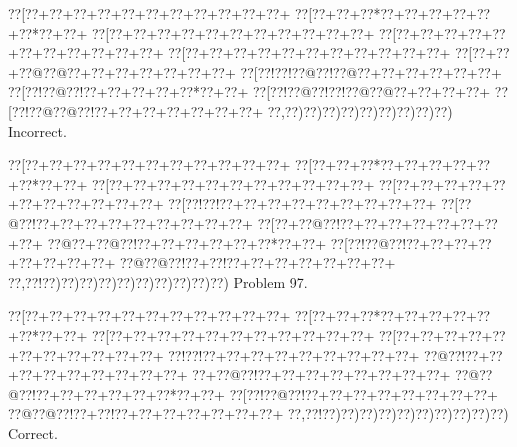 \documentclass[a5paper]{article}
\begin{document}
\begin{center}
{\goo
\0??[\0??+\0??+\0??+\0??+\0??+\0??+\0??+\0??+\0??+\0??+\0??+
\0??[\0??+\0??+\0??*\0??+\0??+\0??+\0??+\0??+\0??*\0??+\0??+
\0??[\0??+\0??+\0??+\0??+\0??+\0??+\0??+\0??+\0??+\0??+\0??+
\0??[\0??+\0??+\0??+\0??+\0??+\0??+\0??+\0??+\0??+\0??+\0??+
\0??[\0??+\0??+\0??+\0??+\0??+\0??+\0??+\0??+\0??+\0??+\0??+
\0??[\0??+\0??+\0??@\0??@\0??+\0??+\0??+\0??+\0??+\0??+\0??+
\0??[\0??!\0??!\0??@\0??!\0??@\0??+\0??+\0??+\0??+\0??+\0??+
\0??[\0??!\0??@\0??!\0??+\0??+\0??+\0??+\0??*\0??+\0??+
\0??[\0??!\0??@\0??!\0??!\0??@\0??@\0??+\0??+\0??+\0??+
\0??[\0??!\0??@\0??@\0??!\0??+\0??+\0??+\0??+\0??+\0??+\0??+
\0??,\0??)\0??)\0??)\0??)\0??)\0??)\0??)\0??)\0??)
}
Incorrect. 

\end{center}
\newpage
\begin{center}
{\goo
\0??[\0??+\0??+\0??+\0??+\0??+\0??+\0??+\0??+\0??+\0??+\0??+
\0??[\0??+\0??+\0??*\0??+\0??+\0??+\0??+\0??+\0??*\0??+\0??+
\0??[\0??+\0??+\0??+\0??+\0??+\0??+\0??+\0??+\0??+\0??+\0??+
\0??[\0??+\0??+\0??+\0??+\0??+\0??+\0??+\0??+\0??+\0??+\0??+
\0??[\0??!\0??!\0??+\0??+\0??+\0??+\0??+\0??+\0??+\0??+\0??+
\0??[\0??@\0??!\0??+\0??+\0??+\0??+\0??+\0??+\0??+\0??+\0??+
\0??[\0??+\0??@\0??!\0??+\0??+\0??+\0??+\0??+\0??+\0??+\0??+
\0??@\0??+\0??@\0??!\0??+\0??+\0??+\0??+\0??+\0??*\0??+\0??+
\0??[\0??!\0??@\0??!\0??+\0??+\0??+\0??+\0??+\0??+\0??+\0??+
\0??@\0??@\0??!\0??+\0??!\0??+\0??+\0??+\0??+\0??+\0??+\0??+
\0??,\0??!\0??)\0??)\0??)\0??)\0??)\0??)\0??)\0??)\0??)\0??)
}
Problem 97.

\end{center}
\begin{center}
{\goo
\0??[\0??+\0??+\0??+\0??+\0??+\0??+\0??+\0??+\0??+\0??+\0??+
\0??[\0??+\0??+\0??*\0??+\0??+\0??+\0??+\0??+\0??*\0??+\0??+
\0??[\0??+\0??+\0??+\0??+\0??+\0??+\0??+\0??+\0??+\0??+\0??+
\0??[\0??+\0??+\0??+\0??+\0??+\0??+\0??+\0??+\0??+\0??+\0??+
\0??!\0??!\0??+\0??+\0??+\0??+\0??+\0??+\0??+\0??+\0??+
\0??@\0??!\0??+\0??+\0??+\0??+\0??+\0??+\0??+\0??+\0??+
\0??+\0??@\0??!\0??+\0??+\0??+\0??+\0??+\0??+\0??+\0??+
\0??@\0??@\0??!\0??+\0??+\0??+\0??+\0??+\0??*\0??+\0??+
\0??[\0??!\0??@\0??!\0??+\0??+\0??+\0??+\0??+\0??+\0??+\0??+
\0??@\0??@\0??!\0??+\0??!\0??+\0??+\0??+\0??+\0??+\0??+\0??+
\0??,\0??!\0??)\0??)\0??)\0??)\0??)\0??)\0??)\0??)\0??)\0??)
}
Correct. 

\end{center}
\end{document}
